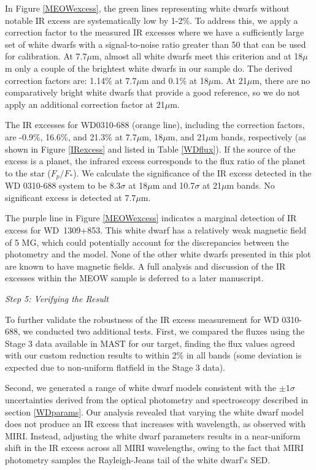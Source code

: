 \documentclass[twocolumn]{aastex631}
\begin{document}
In Figure \ref{MEOWexcess}, the green lines representing white dwarfs without notable IR excess are systematically low by 1-2\%. To address this, we apply a correction factor to the measured IR excesses where we have a sufficiently large set of white dwarfs with a signal-to-noise ratio greater than 50 that can be used for calibration. At 7.7$\mu$m, almost all white dwarfs meet this criterion and at 18$\mu$m only a couple of the brightest white dwarfs in our sample do. The derived correction factors are: 1.14\% at 7.7$\mu$m and 0.1\% at 18$\mu$m.  At 21$\mu$m, there are no comparatively bright white dwarfs that provide a good reference, so we do not apply an additional correction factor at 21$\mu$m. 

The IR excesses for WD0310-688 (orange line), including the correction factors, are -0.9\%, 16.6\%, and 21.3\% at 7.7$\mu$m, 18$\mu$m, and 21$\mu$m bands, respectively (as shown in Figure \ref{IRexcess} and listed in Table \ref{WDflux}). If the source of the excess is a planet, the infrared excess corresponds to the flux ratio of the planet to the star ($F_p/F_*$).  
We calculate the significance of the IR excess detected in the WD 0310-688 system to be 8.3$\sigma$ at 18$\mu$m and 10.7$\sigma$ at 21$\mu$m bands. No significant excess is detected at 7.7$\mu$m.

{The purple line in Figure \ref{MEOWexcess} indicates a marginal detection of IR excess for WD~1309+853. This white dwarf has a relatively weak magnetic field of 5 MG, which could potentially account for the discrepancies between the photometry and the model. None of the other white dwarfs presented in this plot are known to have magnetic fields. A full analysis and discussion of the IR excesses within the MEOW sample is deferred to a later manuscript.} 

\begin{center}
    \vspace{-1mm}
    {\it Step 5: Verifying the Result}
    \vspace{-1mm}
\end{center}
To further validate the robustness of the IR excess measurement for WD 0310-688, we conducted two additional tests. First, we compared the fluxes using the Stage 3 data available in MAST for our target, finding the flux values agreed with our custom reduction results to within 2\% in all bands (some deviation is expected due to non-uniform flatfield in the Stage 3 data).

Second, we generated a range of white dwarf models consistent with the $\pm1\sigma$ uncertainties derived from the optical photometry and spectroscopy described in section \ref{WDparams}. Our analysis revealed that varying the white dwarf model does not produce an IR excess that increases with wavelength, as observed with MIRI. Instead, adjusting the white dwarf parameters results in a near-uniform shift in the IR excess across all MIRI wavelengths, owing to the fact that MIRI photometry samples the Rayleigh-Jeans tail of the white dwarf's SED.
\end{document}

